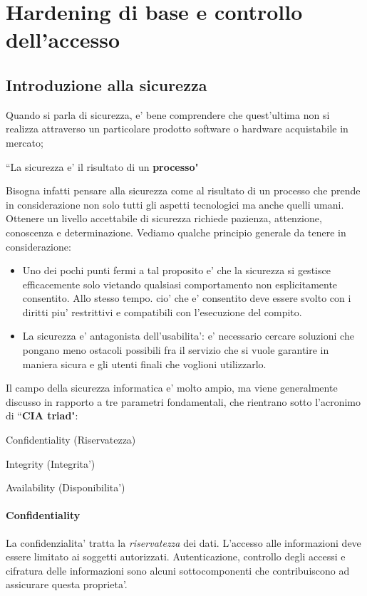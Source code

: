 \section{Hardening di base e controllo dell'accesso}

\subsection{Introduzione alla sicurezza}
Quando si parla di sicurezza, e' bene comprendere che quest'ultima non si realizza attraverso un particolare prodotto software o hardware acquistabile in mercato;
\begin{center}
	``La sicurezza e' il risultato di un \textbf{processo}"
\end{center}
Bisogna infatti pensare alla sicurezza come al risultato di un processo che prende in considerazione non solo tutti gli aspetti tecnologici ma anche quelli umani. Ottenere un livello accettabile di sicurezza richiede pazienza, attenzione, conoscenza e determinazione. Vediamo qualche principio generale da tenere in considerazione:
\begin{itemize}
	\item Uno dei pochi punti fermi a tal proposito e' che la sicurezza si gestisce efficacemente solo vietando qualsiasi comportamento non esplicitamente consentito. Allo stesso tempo. cio' che e' consentito deve essere svolto con i diritti piu' restrittivi e compatibili con l'esecuzione del compito.
	\item La sicurezza e' antagonista dell'usabilita': e' necessario cercare soluzioni che pongano meno ostacoli possibili fra il servizio che si vuole garantire in maniera sicura e gli utenti finali che voglioni utilizzarlo.
\end{itemize}
Il campo della sicurezza informatica e' molto ampio, ma viene generalmente discusso in rapporto a tre parametri fondamentali, che rientrano sotto l'acronimo di ``\textbf{CIA triad}":
\begin{center}
	\item Confidentiality (Riservatezza)
	\item Integrity (Integrita')
	\item Availability (Disponibilita')
\end{center}

\paragraph{Confidentiality} 
La confidenzialita' tratta la \emph{riservatezza} dei dati. L'accesso alle informazioni deve essere limitato ai soggetti autorizzati. Autenticazione, controllo degli accessi e cifratura delle informazioni sono alcuni sottocomponenti che contribuiscono ad assicurare questa proprieta'.

